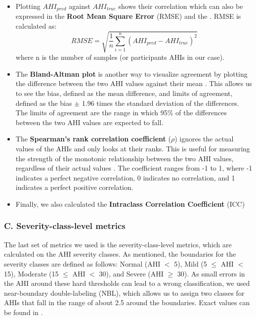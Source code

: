 \begin{itemize}
    \item Plotting $AHI_{pred}$ against $AHI_{true}$ shows their correlation which can also be expressed in the \textbf{Root Mean Square Error} (RMSE) and the . RMSE is calculated as:
    \begin{equation}
        RMSE = \sqrt{\frac{1}{n}\sum_{i=1}^{n}(AHI_{pred} - AHI_{true})^2} 
    \end{equation}
    where n is the number of samples (or participants AHIs in our case).
    \item The \textbf{Bland-Altman plot} is another way to visualize agreement by plotting the difference between the two AHI values against their mean . This allows us to see the bias, defined as the mean difference, and limits of agreement, defined as the bias $\pm$ 1.96 times the standard deviation of the differences. The limits of agreement are the range in which 95\% of the differences between the two AHI values are expected to fall.
    \item The \textbf{Spearman's rank correlation coefficient} ($\rho$) ignores the actual values of the AHIs and only looks at their ranks. This is useful for measuring the strength of the monotonic relationship between the two AHI values, regardless of their actual values . The coefficient ranges from -1 to 1, where -1 indicates a perfect negative correlation, 0 indicates no correlation, and 1 indicates a perfect positive correlation.
    \item Finally, we also calculated the \textbf{Intraclass Correlation Coefficient} (ICC) 
\end{itemize}

\subsubsection*{C. Severity-class-level metrics}

The last set of metrics we used is the severity-class-level metrics, which are calculated on the AHI severity classes. As mentioned, the boundaries for the severity classes are defined as follows: Normal (AHI $<$ 5), Mild (5 $\le$ AHI $<$ 15), Moderate (15 $\le$ AHI $<$ 30), and Severe (AHI $\ge$ 30). As small errors in the AHI around these hard thresholds can lead to a wrong classification, we used near-boundary double-labeling (NBL), which allows us to assign two classes for AHIs that fall in the range of about 2.5 around the boundaries. Exact values can be found in .

